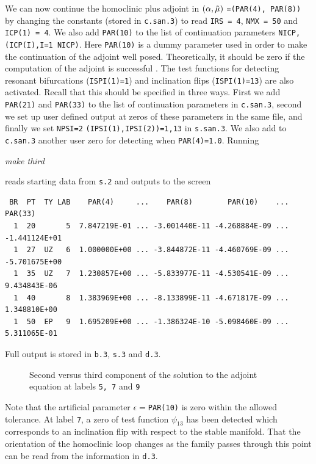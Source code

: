 \documentclass[12pt]{report}
\begin{document}
We can now continue the homoclinic plus
adjoint in $(\alpha,\tilde \mu)$ {\tt =(PAR(4), PAR(8))} by
changing the constants (stored in {\tt c.san.3}) to read
{\tt IRS = 4}, {\tt NMX = 50} and {\tt ICP(1) = 4}.
We also add {\tt PAR(10)} to the list of continuation parameters
{\tt NICP,(ICP(I),I=1 NICP)}. Here {\tt PAR(10)} is a dummy parameter used in
order to make the continuation of the adjoint well posed. Theoretically,
it should be zero if the computation of the adjoint is successful
\cite{Sa:95b}.
The test functions for detecting resonant bifurcations 
({\tt ISPI(1)=1}) and inclination flips ({\tt ISPI(1)=13}) are
also activated. Recall that this should be specified in
three ways. First we add {\tt PAR(21)} and {\tt PAR(33)}
to the list of continuation parameters in {\tt c.san.3}, second we set up user defined
output at zeros of these parameters in the same file, and finally we set {\tt NPSI=2}
{\tt (IPSI(1),IPSI(2))=1,13} in {\tt s.san.3}. We also add to {\tt c.san.3} another user zero
for detecting when {\tt PAR(4)=1.0}.
Running 
\begin{center}
{\it make third }\\
\end{center}
reads starting data from {\tt s.2} and outputs to the screen
\begin{verbatim}
 BR  PT  TY LAB    PAR(4)     ...    PAR(8)        PAR(10)    ...    PAR(33)    
  1  20       5  7.847219E-01 ... -3.001440E-11 -4.268884E-09 ... -1.441124E+01
  1  27  UZ   6  1.000000E+00 ... -3.844872E-11 -4.460769E-09 ... -5.701675E+00
  1  35  UZ   7  1.230857E+00 ... -5.833977E-11 -4.530541E-09 ...  9.434843E-06
  1  40       8  1.383969E+00 ... -8.133899E-11 -4.671817E-09 ...  1.348810E+00
  1  50  EP   9  1.695209E+00 ... -1.386324E-10 -5.098460E-09 ...  5.311065E-01
\end{verbatim}
Full output is stored in {\tt b.3}, {\tt s.3} and {\tt d.3}. 
\begin{figure}[b]
\epsfysize 9.0cm
\centerline{}
\caption{Second versus third component of the solution to the adjoint
equation at labels {\tt 5, 7} and {\tt 9}}
\label{Ftest1}
\end{figure}
Note that the artificial parameter $\epsilon=${\tt PAR(10)} is zero within
the allowed tolerance. At label {\tt 7}, a zero of test function $\psi_{13}$ has
been detected which corresponds to an inclination flip with respect to
the stable manifold. That the orientation of the homoclinic loop
changes as the family passes through this point can be read from
the information in {\tt d.3}.
\end{document}
